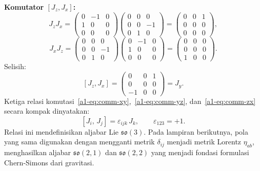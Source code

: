 \vspace{0.5em}
\noindent \textbf{Komutator $[J_z, J_x]$:}
\begin{equation}
    J_z J_x = \begin{pmatrix}0&-1&0\\1&0&0\\0&0&0\end{pmatrix}\!\begin{pmatrix}0&0&0\\0&0&-1\\0&1&0\end{pmatrix}
    = \begin{pmatrix}0&0&1\\0&0&0\\0&0&0\end{pmatrix},
\end{equation}
\begin{equation}
    J_x J_z = \begin{pmatrix}0&0&0\\0&0&-1\\0&1&0\end{pmatrix}\!\begin{pmatrix}0&-1&0\\1&0&0\\0&0&0\end{pmatrix}
    = \begin{pmatrix}0&0&0\\0&0&0\\1&0&0\end{pmatrix}.
\end{equation}
Selisih:
\begin{equation}\label{a1-eq:comm-zx}
    [J_z, J_x] = \begin{pmatrix}0&0&1\\0&0&0\\-1&0&0\end{pmatrix} = J_y.
\end{equation}
Ketiga relasi komutasi~\eqref{a1-eq:comm-xy},~\eqref{a1-eq:comm-yz}, dan~\eqref{a1-eq:comm-zx} secara kompak dinyatakan:
\begin{equation}\label{a1-eq:so3-commutator}
    [J_i,\, J_j] = \varepsilon_{ijk}\,J_k, \qquad \varepsilon_{123} = +1.
\end{equation}
Relasi ini mendefinisikan aljabar Lie $\mathfrak{so}(3)$. Pada lampiran berikutnya, pola yang sama digunakan dengan mengganti metrik $\delta_{ij}$ menjadi metrik Lorentz $\eta_{ab}$, menghasilkan aljabar $\mathfrak{so}(2,1)$ dan $\mathfrak{so}(2,2)$ yang menjadi fondasi formulasi Chern-Simons dari gravitasi.

